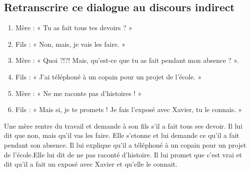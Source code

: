 \documentclass[12pt]{article}
\begin{document}
\subsection{Retranscrire ce dialogue au discours indirect }
\begin{enumerate}
	\item Mère : « Tu as fait tous tes devoirs ? »
	\item Fils : « Non, mais, je vais les faire. » 
	\item Mère : « Quoi ?!?! Mais, qu’est-ce que tu as fait pendant mon absence ? ».
	\item Fils : « J’ai téléphoné à un copain pour un projet de l’école. » 
	\item Mère : « Ne me raconte pas d’histoires ! »
	\item Fils : « Mais si, je te promets ! Je fais l’exposé avec Xavier, tu le connais. »
\end{enumerate}

Une mère rentre du travail et demande à son fils s'il a fait tous ses devoir. Il lui dit que non, mais qu'il vas les faire. Elle s'etonne et lui demande ce qu'il a fait pendant son absence. Il lui explique qu'il a téléphoné à un copain pour un projet de l'école.Elle lui dit de ne pas raconté d'histoire. Il lui promet que c'est vrai et dit qu'il a fait un exposé avec Xavier et qu'elle le connait.
\end{document}
